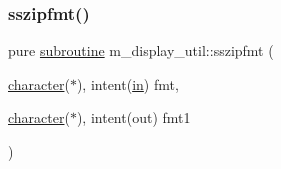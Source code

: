 \subsubsection{\texorpdfstring{sszipfmt()}{sszipfmt()}}
{\footnotesize\ttfamily pure \hyperlink{M__stopwatch_83_8txt_acfbcff50169d691ff02d4a123ed70482}{subroutine} m\+\_\+display\+\_\+util\+::sszipfmt (\begin{DoxyParamCaption}\item[{\hyperlink{option__stopwatch_83_8txt_abd4b21fbbd175834027b5224bfe97e66}{character}($\ast$), intent(\hyperlink{M__journal_83_8txt_afce72651d1eed785a2132bee863b2f38}{in})}]{fmt,  }\item[{\hyperlink{option__stopwatch_83_8txt_abd4b21fbbd175834027b5224bfe97e66}{character}($\ast$), intent(out)}]{fmt1 }\end{DoxyParamCaption})\hspace{0.3cm}{\ttfamily [private]}}


